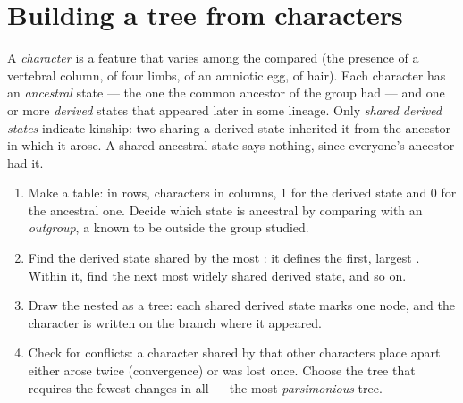 \section{Building a tree from characters}

\begin{definition}\label{def:g12:phylogenetic-trees:states}
A \emph{character} is a feature that varies among the  compared
(the presence of a vertebral column, of four limbs, of an amniotic egg,
of hair). Each character has an \emph{ancestral} state --- the one the
common ancestor of the group had --- and one or more \emph{derived}
states that appeared later in some lineage. Only \emph{shared derived
states} indicate kinship: two  sharing a derived state inherited
it from the ancestor in which it arose. A shared ancestral state says
nothing, since everyone's ancestor had it.
\end{definition}

\begin{method}\label{met:g12:phylogenetic-trees:build}
\begin{enumerate}
  \item Make a table:  in rows, characters in columns, 1 for the
        derived state and 0 for the ancestral one. Decide which state is
        ancestral by comparing with an \emph{outgroup}, a  known
        to be outside the group studied.
  \item Find the derived state shared by the most : it defines
        the first, largest . Within it, find the next most widely
        shared derived state, and so on.
  \item Draw the nested  as a tree: each shared derived state
        marks one node, and the character is written on the branch
        where it appeared.
  \item Check for conflicts: a character shared by  that other
        characters place apart either arose twice (convergence) or was
        lost once. Choose the tree that requires the fewest changes in
        all --- the most \emph{parsimonious} tree.
\end{enumerate}
\end{method}

